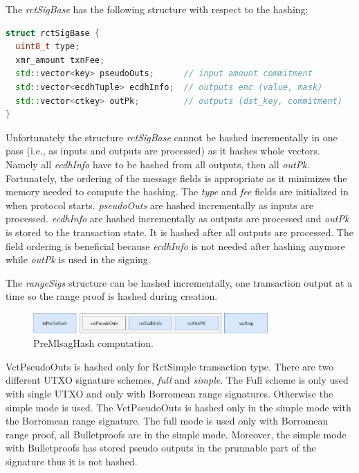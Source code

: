 \documentclass[]{article}
\begin{document}
The \emph{rctSigBase} has the following structure with respect to the hashing:  
\begin{lstlisting}[language=c++]
struct rctSigBase {
  uint8_t type;
  xmr_amount txnFee;
  std::vector<key> pseudoOuts;      // input amount commitment
  std::vector<ecdhTuple> ecdhInfo;  // outputs enc (value, mask)
  std::vector<ctkey> outPk;         // outputs (dst_key, commitment)
}
\end{lstlisting}

Unfortunately the structure \emph{rctSigBase} cannot be hashed incrementally in one pass (i.e., as inputs and outputs are processed) as it hashes whole vectors. Namely all \emph{ecdhInfo} have to be hashed from all outputs, then all \emph{outPk}. Fortunately, the ordering of the message fields is appropriate as it minimizes the memory needed to compute the hashing. The \emph{type} and \emph{fee} fields are initialized in when protocol starts. \emph{pseudoOuts} are hashed incrementally as inputs are processed. \emph{ecdhInfo} are hashed incrementally as outputs are processed and \emph{outPk} is stored to the transaction state. It is hashed after all outputs are processed. The field ordering is beneficial because \emph{ecdhInfo} is not needed after hashing anymore while \emph{outPk} is used in the signing.

The \emph{rangeSigs} structure can be hashed incrementally, one transaction output at a time so the range proof is hashed during creation.

\begin{figure}[H]
	\centering
	\includegraphics[width=0.8\textwidth,clip, angle=0]{img/premlsag_hash.pdf}
	\caption{PreMlsagHash computation.}
\end{figure}


VctPseudoOuts is hashed only for RctSimple transaction type. There are two different UTXO signature schemes, \emph{full} and \emph{simple}. The Full scheme is only used with single UTXO and only with Borromean range signatures. Otherwise the simple mode is used. The VctPseudoOuts is hashed only in the simple mode with the Borromean range signature. The full mode is used only with Borromean range proof, all Bulletproofs are in the simple mode. Moreover, the simple mode with Bulletproofs has stored pseudo outputs in the prunnable part of the signature thus it is not hashed. 
\end{document}
